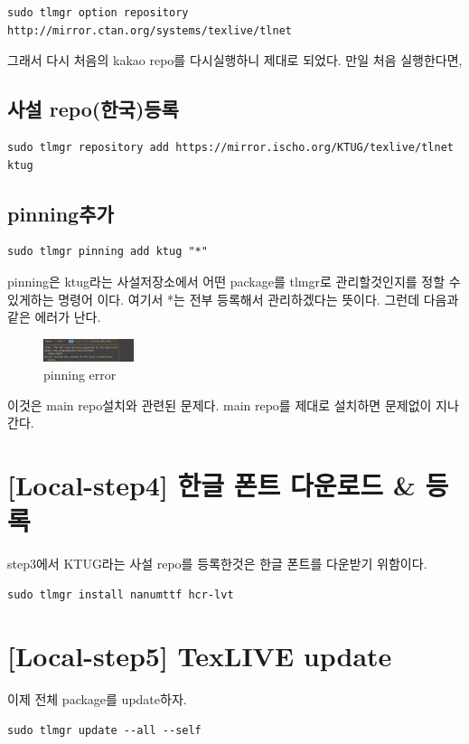 \documentclass[11pt]{article}
\begin{document}
\begin{verbatim}
sudo tlmgr option repository http://mirror.ctan.org/systems/texlive/tlnet
\end{verbatim}

그래서 다시 처음의 kakao repo를 다시실행하니 제대로 되었다. 만일 처음 실행한다면,

\subsection{사설 repo(한국)등록}
\label{sec:org9a2b42e}
\begin{verbatim}
sudo tlmgr repository add https://mirror.ischo.org/KTUG/texlive/tlnet ktug
\end{verbatim}
\subsection{pinning추가}
\label{sec:org45a7951}
\begin{verbatim}
sudo tlmgr pinning add ktug "*"
\end{verbatim}
pinning은 ktug라는 사설저장소에서 어떤 package를 tlmgr로
관리할것인지를 정할 수 있게하는 명령어 이다. 여기서 *는 전부 등록해서
관리하겠다는 뜻이다.  그런데 다음과 같은 에러가 난다.

\begin{figure}[htbp]
\centering
\includegraphics[width=100px]{../static/img/tex/tex-pinning.png}
\caption{\label{fig:org35ee9c5}pinning error}
\end{figure}

이것은 main repo설치와 관련된 문제다. main repo를 제대로 설치하면
문제없이 지나간다.
\section{[Local-step4] 한글 폰트 다운로드 \& 등록}
\label{sec:orga46c395}
step3에서 KTUG라는 사설 repo를 등록한것은 한글 폰트를 다운받기
위함이다.

\begin{verbatim}
sudo tlmgr install nanumttf hcr-lvt
\end{verbatim}
\section{[Local-step5] TexLIVE update}
\label{sec:org735d70d}
이제 전체 package를 update하자.
\begin{verbatim}
sudo tlmgr update --all --self
\end{verbatim}
\end{document}
